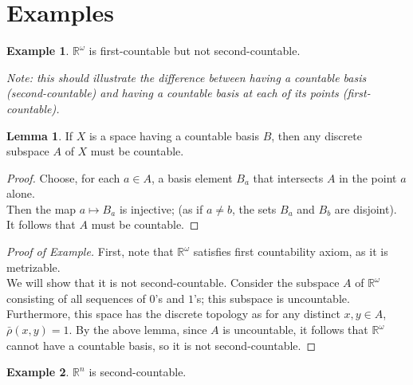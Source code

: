 \documentclass[11pt]{article}
\newcommand{\R}{\mathbb{R}}
\theoremstyle{definition}
\theoremstyle{theorem}
\newtheorem*{lemma}{Lemma}
\newtheorem*{eg}{Example}
\begin{document}
    

\section{Examples}

\begin{eg}$\mathbb{R}^\omega$ is first-countable but not second-countable.\end{eg}

\textit{Note: this should illustrate the difference between having a countable basis (second-countable) and having a countable basis at each of its points (first-countable).}

\begin{lemma}
If $X$ is a space having a countable basis $B$, then any discrete subspace $A$ of $X$ must be countable.
\end{lemma}

\begin{proof}
Choose, for each $a \in A$, a basis element $B_a$ that intersects $A$ in the point $a$ alone. \\

Then the map $a \mapsto B_a$ is injective; (as if $a \neq b$, the sets $B_a$ and $B_b$ are disjoint). It follows that $A$ must be countable.
\end{proof}

\begin{proof}[Proof of Example]
First, note that $\R^\omega$ satisfies first countability axiom, as it is metrizable. \\

We will show that it is not second-countable. Consider the subspace $A$ of $\mathbb{R}^\omega$ consisting of all sequences of $0$'s and $1$'s; this subspace is uncountable. \\

Furthermore, this space has the discrete topology as for any distinct $x, y \in A$, $\bar{\rho}(x, y) = 1$. By the above lemma, since $A$ is uncountable, it follows that $\R^\omega$ cannot have a countable basis, so it is not second-countable.
\end{proof}




\begin{eg} $\mathbb{R}^n$ is second-countable. \end{eg}
\end{document}
